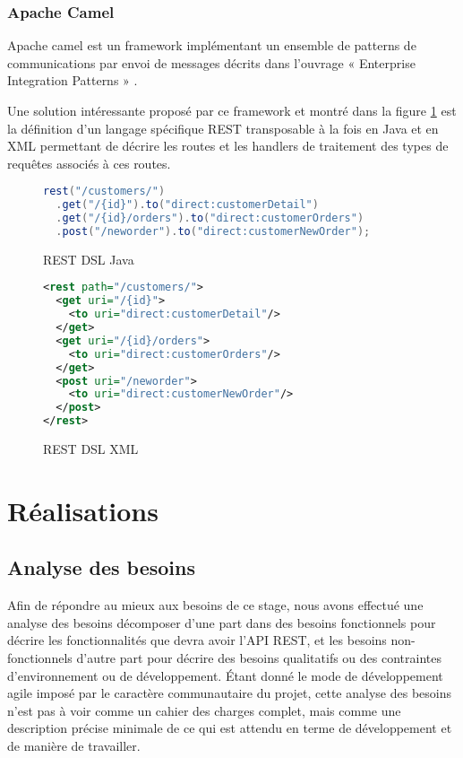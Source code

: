 \documentclass[a4paper, 11pt]{report}
\begin{document}
\subsection{Apache Camel}

Apache camel est un framework implémentant un ensemble de patterns de
communications par envoi de messages décrits dans l'ouvrage «
Enterprise Integration Patterns » \cite{hohpe2003enterprise}.

Une solution intéressante proposé par ce framework et montré dans la
figure \ref{fig:restdsl} est la définition d'un langage spécifique REST
transposable à la fois en Java et en XML permettant de décrire les
routes et les handlers de traitement des types de requêtes associés à
ces routes.

\begin{figure}
  \ContinuedFloat*
  \begin{lstlisting}[language=java]
rest("/customers/")
  .get("/{id}").to("direct:customerDetail")
  .get("/{id}/orders").to("direct:customerOrders")
  .post("/neworder").to("direct:customerNewOrder");
  \end{lstlisting}
  \caption{REST DSL Java}
\end{figure}

\begin{figure}
  \ContinuedFloat
  \begin{lstlisting}[language=xml]
<rest path="/customers/">
  <get uri="/{id}">
    <to uri="direct:customerDetail"/>
  </get>
  <get uri="/{id}/orders">
    <to uri="direct:customerOrders"/>
  </get>
  <post uri="/neworder">
    <to uri="direct:customerNewOrder"/>
  </post>
</rest>
  \end{lstlisting}
  \caption{REST DSL XML}
  \label{fig:restdsl}
\end{figure}

\chapter{Réalisations}

\section{Analyse des besoins}

Afin de répondre au mieux aux besoins de ce stage, nous avons effectué
une analyse des besoins décomposer d'une part dans des besoins
fonctionnels pour décrire les fonctionnalités que devra avoir l'API
REST, et les besoins non-fonctionnels d'autre part pour décrire des
besoins qualitatifs ou des contraintes d'environnement ou de
développement.  Étant donné le mode de développement agile imposé par
le caractère communautaire du projet, cette analyse des besoins n'est
pas à voir comme un cahier des charges complet, mais comme une
description précise minimale de ce qui est attendu en terme de
développement et de manière de travailler.
\end{document}
